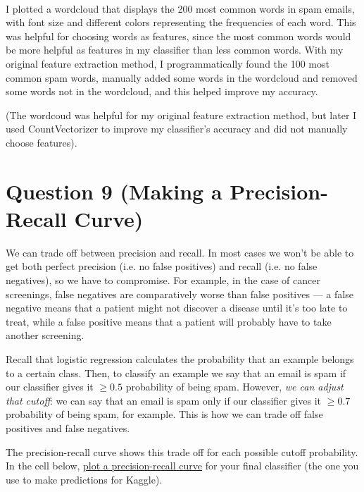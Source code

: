 \documentclass[11pt]{article}
\begin{document}
    \begin{center}
    \end{center}
    { \hspace*{\fill} \\}
    
    I plotted a wordcloud that displays the 200 most common words in spam
emails, with font size and different colors representing the frequencies
of each word. This was helpful for choosing words as features, since the
most common words would be more helpful as features in my classifier
than less common words. With my original feature extraction method, I
programmatically found the 100 most common spam words, manually added
some words in the wordcloud and removed some words not in the wordcloud,
and this helped improve my accuracy.

(The wordcoud was helpful for my original feature extraction method, but
later I used CountVectorizer to improve my classifier's accuracy and did
not manually choose features).

    \section{Question 9 (Making a Precision-Recall
Curve)}\label{question-9-making-a-precision-recall-curve}

We can trade off between precision and recall. In most cases we won't be
able to get both perfect precision (i.e. no false positives) and recall
(i.e. no false negatives), so we have to compromise. For example, in the
case of cancer screenings, false negatives are comparatively worse than
false positives --- a false negative means that a patient might not
discover a disease until it's too late to treat, while a false positive
means that a patient will probably have to take another screening.

Recall that logistic regression calculates the probability that an
example belongs to a certain class. Then, to classify an example we say
that an email is spam if our classifier gives it \(\ge 0.5\) probability
of being spam. However, \emph{we can adjust that cutoff}: we can say
that an email is spam only if our classifier gives it \(\ge 0.7\)
probability of being spam, for example. This is how we can trade off
false positives and false negatives.

The precision-recall curve shows this trade off for each possible cutoff
probability. In the cell below,
\href{http://scikit-learn.org/stable/auto_examples/model_selection/plot_precision_recall.html\#plot-the-precision-recall-curve}{plot
a precision-recall curve} for your final classifier (the one you use to
make predictions for Kaggle).
\end{document}
